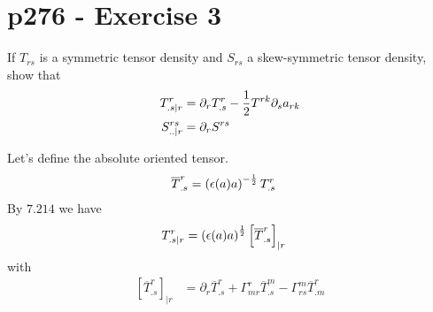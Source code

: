 \section{p276 - Exercise 3}
\begin{tcolorbox}
If $T_{rs}$ is a symmetric tensor density and $S_{rs}$ a skew-symmetric tensor density, show that
\begin{align*}
T^r_{.s|r}&= \partial_r T^r_{.s} - \frac{1}{2} T^{rk}\partial_s a_{rk}\\
S^{rs}_{..|r}&= \partial_r S^{rs}
\end{align*}
\end{tcolorbox}
Let's define the absolute oriented tensor.
\begin{align}
\overline{T}^r_{.s} &= \left(\epsilon (a) a\right)^{-\frac{1}{2}}T^r_{.s}
\end{align}
By $\mathbf{7.214}$ we have
\begin{align}
T^r_{.s|r}&= \left(\epsilon (a) a \right)^{\frac{1}{2}}\left[\overline{T}^r_{.s} \right]_{|r}
\end{align}
with 
\begin{align}
\left[\overline{T}^r_{.s} \right]_{|r}&= \partial_r \overline{T}^r_{.s}  + \Gamma^r_{mr}\overline{T}^m_{.s} - \Gamma^m_{rs}\overline{T}^r_{.m}
\end{align}

